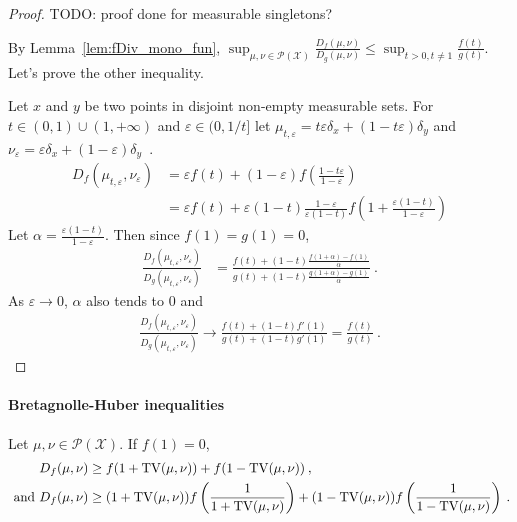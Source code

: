 \begin{proof}%
{}
TODO: proof done for measurable singletons?

By Lemma~\ref{lem:fDiv_mono_fun}, $\sup_{\mu, \nu \in \mathcal P(\mathcal X)} \frac{D_f(\mu, \nu)}{D_g(\mu, \nu)} \le \sup_{t > 0, t \ne 1} \frac{f(t)}{g(t)}$. Let's prove the other inequality.

Let $x$ and $y$ be two points in disjoint non-empty measurable sets. For $t \in (0,1) \cup (1, +\infty)$ and $\varepsilon \in (0, 1/t]$ let $\mu_{t, \varepsilon} = t \varepsilon \delta_x + (1 - t \varepsilon) \delta_y$ and $\nu_\varepsilon = \varepsilon \delta_x + (1 - \varepsilon) \delta_y$~.
\begin{align*}
D_f(\mu_{t, \varepsilon}, \nu_\varepsilon)
&= \varepsilon f(t) + (1 - \varepsilon) f(\frac{1 - t \varepsilon}{1 - \varepsilon})
\\
&= \varepsilon f(t) + \varepsilon (1 - t) \frac{1 - \varepsilon}{\varepsilon (1 - t)} f(1 + \frac{\varepsilon(1 - t)}{1 - \varepsilon})
\end{align*}
Let $\alpha = \frac{\varepsilon (1 - t)}{1 - \varepsilon}$. Then since $f(1) = g(1) = 0$,
\begin{align*}
\frac{D_f(\mu_{t, \varepsilon}, \nu_\varepsilon)}{D_g(\mu_{t, \varepsilon}, \nu_\varepsilon)}
&= \frac{f(t) + (1 - t)\frac{f(1 + \alpha) - f(1)}{\alpha}}{g(t) + (1 - t)\frac{g(1 + \alpha) - g(1)}{\alpha}} \: .
\end{align*}
As $\varepsilon \to 0$, $\alpha$ also tends to 0 and
\begin{align*}
\frac{D_f(\mu_{t, \varepsilon}, \nu_\varepsilon)}{D_g(\mu_{t, \varepsilon}, \nu_\varepsilon)}
\to \frac{f(t) + (1 - t)f'(1)}{g(t) + (1 - t)g'(1)}
= \frac{f(t)}{g(t)}
\: .
\end{align*}
\end{proof}

\paragraph{Bretagnolle-Huber inequalities}

\begin{theorem}
  \label{thm:bh_fDiv}
  Let $\mu, \nu \in \mathcal P(\mathcal X)$. If $f(1) = 0$,
  \begin{align*}
  D_f(\mu, \nu)
  &\ge f(1 + \operatorname{TV}(\mu, \nu)) + f(1 - \operatorname{TV}(\mu, \nu))
  \: , \\
  \text{ and }
  D_f(\mu, \nu)
  &\ge (1 + \operatorname{TV}(\mu, \nu))f\left(\frac{1}{1 + \operatorname{TV}(\mu, \nu)}\right) + (1 - \operatorname{TV}(\mu, \nu))f\left(\frac{1}{1 - \operatorname{TV}(\mu, \nu)}\right)
  \: .
  \end{align*}
\end{theorem}

